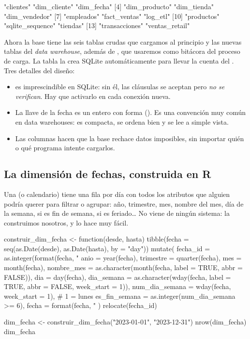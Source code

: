 \begin{rsalida}
 [1] "clientes"        "dim_cliente"     "dim_fecha"      
 [4] "dim_producto"    "dim_tienda"      "dim_vendedor"   
 [7] "empleados"       "fact_ventas"     "log_etl"        
[10] "productos"       "sqlite_sequence" "tiendas"        
[13] "transacciones"   "ventas_retail"  
\end{rsalida}

Ahora la base tiene las seis tablas crudas que cargamos al principio y las
nuevas tablas del \emph{data warehouse}, además de , que
usaremos como bitácora del proceso de carga. La tabla
 la crea SQLite automáticamente para llevar la
cuenta del . Tres detalles del diseño:

\begin{itemize}
  \item {} es imprescindible en SQLite: sin
        él, las cláusulas  se aceptan pero \emph{no se
        verifican}. Hay que activarlo en cada conexión nueva.
  \item La llave de la fecha es un entero con forma 
        (). Es una convención muy común en data warehouses:
        es compacta, se ordena bien y se lee a simple vista.
  \item Las columnas  hacen que la base
        rechace datos imposibles, sin importar quién o qué programa intente
        cargarlos.
\end{itemize}

\subsection{La dimensión de fechas, construida en R}

Una  (o calendario) tiene una fila por día con
todos los atributos que alguien podría querer para filtrar o agrupar: año,
trimestre, mes, nombre del mes, día de la semana, si es fin de semana, si es
feriado\ldots{} No viene de ningún sistema: la construimos nosotros, y
 lo hace muy fácil.

\begin{rcode}
construir_dim_fecha <- function(desde, hasta) {
  tibble(fecha = seq(as.Date(desde), as.Date(hasta), by = "day")) %
    mutate(
      fecha_id   = as.integer(format(fecha, "%
      anio       = year(fecha),
      trimestre  = quarter(fecha),
      mes        = month(fecha),
      nombre_mes = as.character(month(fecha, label = TRUE, abbr = FALSE)),
      dia        = day(fecha),
      dia_semana = as.character(wday(fecha, label = TRUE, abbr = FALSE,
                                     week_start = 1)),
      num_dia_semana = wday(fecha, week_start = 1),   # 1 = lunes
      es_fin_semana  = as.integer(num_dia_semana >= 6),
      fecha      = format(fecha, "%
    ) %
    relocate(fecha_id)
}

dim_fecha <- construir_dim_fecha("2023-01-01", "2023-12-31")
nrow(dim_fecha)
dim_fecha %
\end{rcode}

